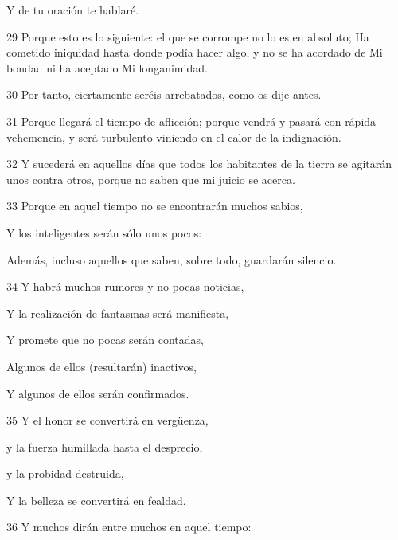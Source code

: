 \par Y de tu oración te hablaré.

\par 29 Porque esto es lo siguiente: el que se corrompe no lo es en absoluto; Ha cometido iniquidad hasta donde podía hacer algo, y no se ha acordado de Mi bondad ni ha aceptado Mi longanimidad.

\par 30 Por tanto, ciertamente seréis arrebatados, como os dije antes.

\par 31 Porque llegará el tiempo de aflicción; porque vendrá y pasará con rápida vehemencia, y será turbulento viniendo en el calor de la indignación.

\par 32 Y sucederá en aquellos días que todos los habitantes de la tierra se agitarán unos contra otros, porque no saben que mi juicio se acerca.

\par 33 Porque en aquel tiempo no se encontrarán muchos sabios,

\par Y los inteligentes serán sólo unos pocos:

\par Además, incluso aquellos que saben, sobre todo, guardarán silencio.

\par 34 Y habrá muchos rumores y no pocas noticias,

\par Y la realización de fantasmas será manifiesta,

\par Y promete que no pocas serán contadas,

\par Algunos de ellos (resultarán) inactivos,

\par Y algunos de ellos serán confirmados.

\par 35 Y el honor se convertirá en vergüenza,

\par y la fuerza humillada hasta el desprecio,

\par y la probidad destruida,

\par Y la belleza se convertirá en fealdad.

\par 36 Y muchos dirán entre muchos en aquel tiempo:

